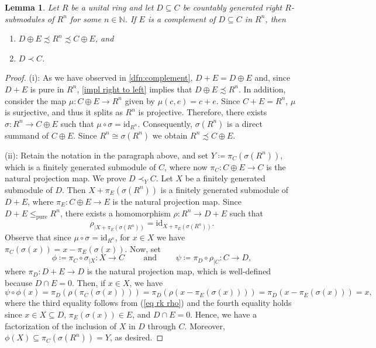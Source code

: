 \documentclass[11pt]{amsart}
\numberwithin{equation}{section}
\newtheorem{lma}{Lemma}[section]
\theoremstyle{definition}
\theoremstyle{plain}
\theoremstyle{definition}
\begin{document}
\begin{lma}
\label{rmk:remarks-for-complement}
Let $R$ be a unital ring and let $D\subseteq C$ be countably generated right $R$-submodules of $R^n$ for some $n \in \mathbb{N}$. If $E$ is a complement of $D \subseteq C$ in $R^n$, then
\begin{enumerate}[label=\rm{(\roman*)}]
    \item $D \oplus E \precsim R^n \precsim C \oplus E$, and 
    \item $D \prec C$.
\end{enumerate}
\end{lma}
\begin{proof}
(i): As we have observed in \autoref{dfn:complement}, $D + E = D \oplus E$ and, since $D + E$ is pure in $R^n$, \autoref{impl right to left} implies that $D \oplus E \precsim R^n$. In addition, consider the map $\mu \colon C \oplus E \rightarrow R^n$ given by $\mu(c,e) = c + e$. Since $C + E = R^n$, $\mu$ is surjective, and thus it splits as $R^n$ is projective. Therefore, there exists $\sigma \colon R^n \rightarrow C \oplus E$ such that $\mu \circ \sigma = \mathrm{id}_{R^n}$. Consequently, $\sigma(R^n)$ is a direct summand of $C \oplus E$. Since $R^n \cong \sigma(R^n)$ we obtain $R^n \precsim C \oplus E$.

(ii): Retain the notation in the paragraph above, and set $Y \coloneqq \pi_C(\sigma(R^n))$, which is a finitely generated submodule of $C$, where now $\pi_C \colon C \oplus E \rightarrow C$ is the natural projection map. %
We prove $D \prec_Y C$. Let $X$ be a finitely generated submodule of $D$. Then $X + \pi_E(\sigma(R^n))$ is a finitely generated submodule of $D + E$, where $\pi_E \colon C \oplus E \rightarrow E$ is the natural projection map. Since $D + E \leq_{\mathrm{pure}} R^n$, there exists a homomorphism $\rho\colon R^n \rightarrow D + E$ such that
\begin{equation} \label{eq rk rho}
    \rho_{|X + \pi_E(\sigma(R^n))} = \mathrm{id}_{X + \pi_E(\sigma(R^n))}.
\end{equation}
Observe that since $\mu \circ \sigma = \mathrm{id}_{R^n}$, for $x \in X$ we have $\pi_C(\sigma(x)) = x - \pi_E(\sigma(x))$. Now, set 
\begin{equation*}
    \phi \coloneqq \pi_C \circ \sigma_{|X} \colon X \longrightarrow C \qquad \text{ and } \qquad \psi \coloneqq \pi_D \circ \rho_{|C} \colon C \longrightarrow D,
\end{equation*}
where $\pi_D \colon D + E \rightarrow D$ is the natural projection map, which is well-defined because $D \cap E = 0$. Then, if $x \in X$, we have
\begin{equation*}
    \psi\circ\phi (x) = \pi_D(\rho(\pi_C(\sigma(x)))) = \pi_D(\rho(x - \pi_E(\sigma(x)))) = \pi_D(x - \pi_E(\sigma(x))) = x,
\end{equation*}
where the third equality follows from (\ref{eq rk rho}) and the fourth equality holds since $x \in X \subseteq D$, $\pi_E(\sigma(x)) \in E$, and $D \cap E = 0$. Hence, we have a factorization of the inclusion of $X$ in $D$ through $C$. Moreover, $\phi(X) \subseteq \pi_C(\sigma(R^n)) = Y$, as desired.
\end{proof}
\end{document}
